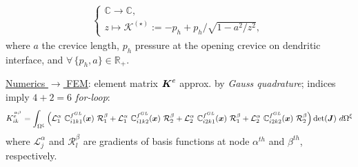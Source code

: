 \documentclass[25pt, a0paper,
portrait,
margin=2mm, 
innermargin=2mm, 
blockverticalspace=7mm, %
colspace=2mm, %
subcolspace=0mm]{tikzposter}
\newcommand{\mbR}{\mathbb{R}}
\newcommand{\mbC}{\mathbb{C}}
\newcommand{\mcK}{\mathcal{K}}
\begin{document}
{\begin{minipage}{0.54\textwidth}
\begin{mdframed}
\begin{align*}
\begin{cases}
					\mbC \to \mbC, \\
					z \mapsto 
					\mcK^{(\star)}:=
					- p_{h} + p_{h}/\sqrt{1 - a^2/z^2},\
				\end{cases}
			\end{align*}
			where $a$ the crevice length, $p_{h}$ pressure at the opening crevice on dendritic interface, and $\forall \, \{p_{h},a\}\in\mbR_{+}$.
		\end{mdframed}
		\begin{mdframed}
			\underline{Numerics $\rightarrow$ FEM}:
			element matrix ${\boldsymbol{\mathnormal K}}^{e}$
			approx. by \textit{Gauss quadrature}; 
			indices imply \textit{$4+2=6$ \textit{for}-loop}:
			\begin{align*}
				K^{\stackrel{\alpha\beta}{e\ \ }}_{ik} = 
				\int_{\Omega^{\xi}}
				\left(
				\mathcal{L}^{\alpha}_{1} \ \mathbb{C}_{i1k1}^{f^{GL}}(\Bx) \ \mathcal{R}^{\beta}_{1} +
				\mathcal{L}^{\alpha}_{1} \ \mathbb{C}_{i1k2}^{f^{GL}}(\Bx) \ \mathcal{R}^{\beta}_{2} +
				\mathcal{L}^{\alpha}_{2} \ \mathbb{C}_{i2k1}^{f^{GL}}(\Bx) \ \mathcal{R}^{\beta}_{1} +
				\mathcal{L}^{\alpha}_{2} \ \mathbb{C}_{i2k2}^{f^{GL}}(\Bx) \ \mathcal{R}^{\beta}_{2}
				\right)
				\det(\BJ) \ d\Omega^{\xi}
			\end{align*}
			where $\mathcal{L}^{\alpha}_{j}$ and $\mathcal{R}^{\beta}_{l}$ are gradients of basis functions at node $\alpha^{th}$ and $\beta^{th}$, respectively.
		\end{mdframed}
	\end{minipage}
	\vspace{-0.4cm}
}
\end{document}
